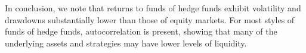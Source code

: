 \documentclass[11pt]{article}
\begin{document}
In conclusion, we note that returns to funds of hedge funds exhibit volatility and drawdowns substantially lower than those of equity markets. For most styles of funds of hedge funds, autocorrelation is present, showing that many of the underlying assets and strategies may have lower levels of liquidity.
\end{document}
